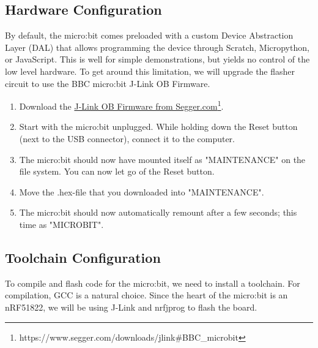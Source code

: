 \documentclass[11pt,a4paper]{article}
\begin{document}
\subsection{Hardware Configuration}
By default, the micro:bit comes preloaded with a custom Device Abstraction Layer (DAL) that allows programming the device through Scratch, Micropython, or JavaScript. This is well for simple demonstrations, but yields no control of the low level hardware. To get around this limitation, we will upgrade the flasher circuit to use the BBC micro:bit J-Link OB Firmware.

\begin{enumerate}
\item Download the \href{https://www.segger.com/downloads/jlink#BBC\_microbit}{J-Link OB Firmware from Segger.com}\footnote{https://www.segger.com/downloads/jlink\#BBC\_microbit}.
\item Start with the micro:bit unplugged. While holding down the Reset button (next to the USB connector), connect it to the computer.
\item The micro:bit should now have mounted itself as "MAINTENANCE" on the file system. You can now let go of the Reset button.
\item Move the .hex-file that you downloaded into "MAINTENANCE".
\item The micro:bit should now automatically remount after a few seconds; this time as "MICROBIT".
\end{enumerate}

\subsection{Toolchain Configuration}
\label{sec::toolchain_config}
To compile and flash code for the micro:bit, we need to install a toolchain. For compilation, GCC is a natural choice. Since the heart of the micro:bit is an nRF51822, we will be using J-Link and nrfjprog to flash the board.
\end{document}
